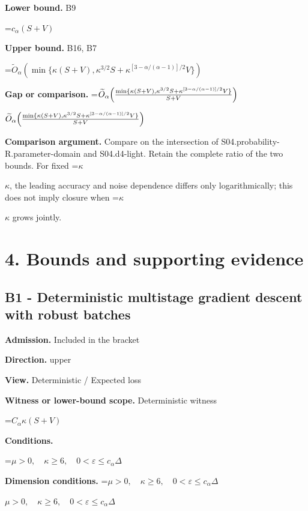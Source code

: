 \documentclass[10pt,a4paper]{article}
\newcommand{\AtlasMath}[1]{\par\begingroup\centering\setbox0=\hbox{$\displaystyle #1$}\ifdim\wd0>1.4\linewidth\typeout{ATLAS WIDE FORMULA: \the\wd0}\fi\ifdim\wd0>\linewidth\resizebox{\linewidth}{!}{\box0}\else\box0\fi\par\endgroup}
\newcommand{\AtlasInlineMath}[1]{\begingroup\setbox0=\hbox{$#1$}\ifdim\wd0>.4\linewidth\endgroup\AtlasMath{#1}\else\endgroup$#1$\fi}
\begin{document}
\textbf{Lower bound.} B9



\AtlasMath{c_\alpha(S+V)}


\textbf{Upper bound.} B16, B7



\AtlasMath{\widetilde{O}_\alpha(\min\{\kappa(S+V),\kappa^{3/2}S+\kappa^{[3-\alpha/(\alpha-1)]/2}V\})}


\textbf{Gap or comparison.} \AtlasInlineMath{\widetilde{O}_\alpha\!\left({\min\{\kappa(S+V),\kappa^{3/2}S+\kappa^{[3-\alpha/(\alpha-1)]/2}V\}\over S+V}\right)}



\textbf{Comparison argument.} Compare on the intersection of S04.probability-R.parameter-domain and S04.d4-light. Retain the complete ratio of the two bounds. For fixed \AtlasInlineMath{\kappa}, the leading accuracy and noise dependence differs only logarithmically; this does not imply closure when \AtlasInlineMath{\kappa} grows jointly.



\section{4. Bounds and supporting evidence}


\subsection{B1 - Deterministic multistage gradient descent with robust batches}


\textbf{Admission.} Included in the bracket



\textbf{Direction.} upper



\textbf{View.} Deterministic / Expected loss



\textbf{Witness or lower-bound scope.} Deterministic witness



\AtlasMath{C_\alpha\kappa(S+V)}


\textbf{Conditions.}
\AtlasMath{\mu>0,\quad\kappa\ge6,\quad0<\varepsilon\le c_\alpha\Delta}




\textbf{Dimension conditions.} \AtlasInlineMath{\mu>0,\quad\kappa\ge6,\quad0<\varepsilon\le c_\alpha\Delta}
\end{document}

